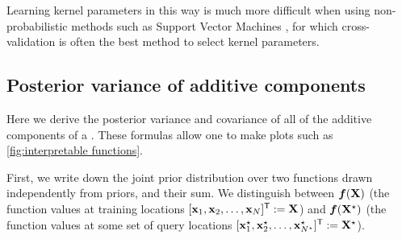 Learning kernel parameters in this way is much more difficult when using non-probabilistic methods such as Support Vector Machines \citep{cortes1995support}, for which cross-validation is often the best method to select kernel parameters.



\subsection{Posterior variance of additive components}
\label{sec:posterior-variance}


Here we derive the posterior variance and covariance of all of the additive components of a \gp{}.
These formulas allow one to make plots such as \cref{fig:interpretable functions}.

First, we write down the joint prior distribution over two functions drawn independently from \gp{} priors, and their sum.
We distinguish between $\boldsymbol{f}(\mathbf{X})$ (the function values at training locations $[{\bf{x}}_1, {\bf{x}}_2, \ldots, {\bf{x}}_N]^{\mathsf{T}} \mathrel{:\mkern-0.25mu=} \mathbf{X}$) and  $\boldsymbol{f}(\mathbf{X}^\star)$ (the function values at some set of query locations $[{\bf{x}}_1^\star, {\bf{x}}_2^\star, \ldots, {\bf{x}}_{N^\star}^\star]^{\mathsf{T}} \mathrel{:\mkern-0.25mu=} \mathbf{X}^\star$).

